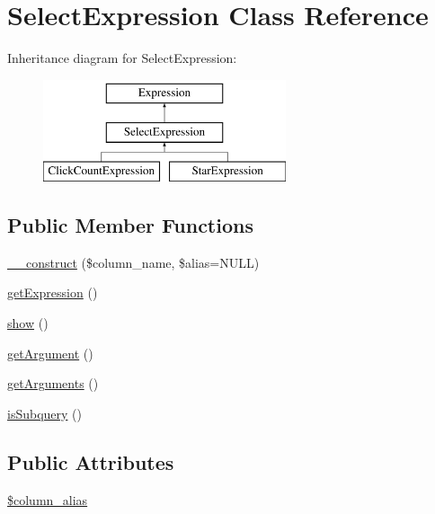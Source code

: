 \hypertarget{classSelectExpression}{\section{Select\-Expression Class Reference}
\label{classSelectExpression}
}
Inheritance diagram for Select\-Expression\-:\begin{figure}[H]
\begin{center}
\leavevmode
\includegraphics[height=3.000000cm]{classSelectExpression}
\end{center}
\end{figure}
\subsection*{Public Member Functions}
\begin{DoxyCompactItemize}
\item 
\hyperlink{classSelectExpression_aa0b7460c0863d1bb60d8a039f1e87274}{\-\_\-\-\_\-construct} (\$column\-\_\-name, \$alias=N\-U\-L\-L)
\item 
\hyperlink{classSelectExpression_a860e81d13389a53617fa27c377aa4e2c}{get\-Expression} ()
\item 
\hyperlink{classSelectExpression_ad6fe2f8979f56814a8b09de05fa2b5a6}{show} ()
\item 
\hyperlink{classSelectExpression_a1311337274f53d0f3705673e86990a0b}{get\-Argument} ()
\item 
\hyperlink{classSelectExpression_a41d457ce5fc7cedc050c2c34a2286d9f}{get\-Arguments} ()
\item 
\hyperlink{classSelectExpression_a9b827b574a24dbbaa54932a639d8d5aa}{is\-Subquery} ()
\end{DoxyCompactItemize}
\subsection*{Public Attributes}
\begin{DoxyCompactItemize}
\item 
\hyperlink{classSelectExpression_ae74dfde6f65f67f6cfadb3f992f2c3b9}{\$column\-\_\-alias}
\end{DoxyCompactItemize}


